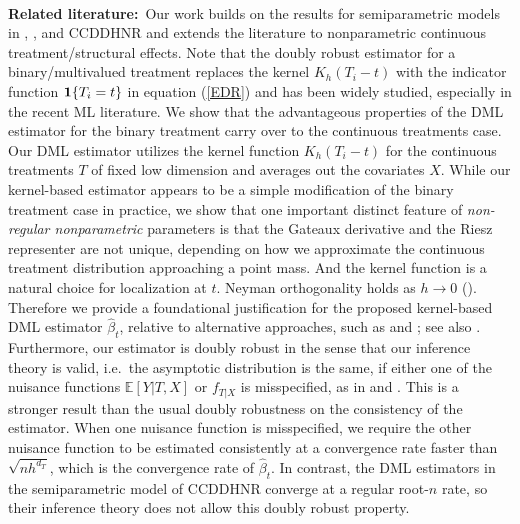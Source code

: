 \documentclass[lettersize, 12pt]{article}
\begin{document}
\\[5pt]
\textbf{Related literature:}\
Our work builds on the results for semiparametric models in \cite{IchimuraNewey22QE}, \cite{CEINR}, and CCDDHNR and extends the literature to nonparametric continuous treatment/structural effects.
Note that the doubly robust estimator for a binary/multivalued treatment replaces the kernel $K_h(T_i - t)$ with the indicator function ${\bf 1}\{T_i=t\}$ in equation (\ref{EDR}) and has been widely studied, especially in the recent ML literature.
We show that the advantageous properties of the DML estimator for the binary treatment carry over to the continuous treatments case.
Our DML estimator utilizes the kernel function $K_h(T_i - t)$ for the continuous treatments $T$ of fixed low dimension and averages out the covariates $X$.
While our kernel-based estimator appears to be a simple modification of the binary treatment case in practice, 
we show that one important distinct feature of {\it non-regular nonparametric} parameters is that 
the Gateaux derivative and the Riesz representer are not unique, depending on how we approximate the continuous treatment distribution approaching a point mass.    
And the kernel function is a natural choice for localization at $t$.
Neyman orthogonality holds as $h \rightarrow 0$ (\citep{Neyman}).
Therefore we provide a foundational justification for the proposed kernel-based DML estimator $\hat\beta_t$, relative to alternative approaches, such as \cite{Kennedy} and \cite{SC}; see also \cite{VBL}.
Furthermore, 
our estimator is doubly robust in the sense that our inference theory is valid, i.e.\ the asymptotic distribution is the same, if either one of the nuisance functions $\mathbb{E}[Y|T,X]$ or $f_{T|X}$ is misspecified, as in \cite{Kennedy} and \cite{Westling}.
This is a stronger result than the usual doubly robustness on the consistency of the estimator.
When one nuisance function is misspecified, we require the other nuisance function to be estimated consistently at a convergence rate faster than $\sqrt{nh^{d_T}}$, which is the convergence rate of $\hat\beta_t$.
In contrast, the DML estimators in the semiparametric model of CCDDHNR converge at a regular root-$n$ rate, 
so their inference theory does not allow this doubly robust property.
\end{document}
